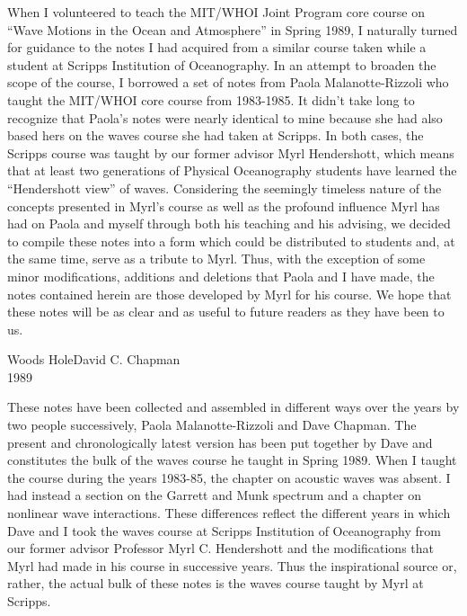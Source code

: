 When I volunteered to teach the MIT/WHOI Joint Program core course on
``Wave Motions in the Ocean and Atmosphere'' in Spring 1989, I naturally turned for
guidance to the notes I had acquired from a similar course taken while a student at
Scripps Institution of Oceanography. In an attempt to broaden the scope of the course,
I borrowed a set of notes from Paola Malanotte-Rizzoli who taught the MIT/WHOI
core course from 1983-1985. It didn't take long to recognize that Paola's notes were
nearly identical to mine because she had also based hers on the waves course she had
taken at Scripps. In both cases, the Scripps course was taught by our former advisor
Myrl Hendershott, which means that at least two generations of Physical
Oceanography students have learned the ``Hendershott view'' of waves. Considering
the seemingly timeless nature of the concepts presented in Myrl's course as well as the
profound influence Myrl has had on Paola and myself through both his teaching and
his advising, we decided to compile these notes into a form which could be distributed
to students and, at the same time, serve as a tribute to Myrl. Thus, with the exception
of some minor modifications, additions and deletions that Paola and I have made, the
notes contained herein are those developed by Myrl for his course. We hope that these
notes will be as clear and as useful to future readers as they have been to us.

\vspace{0.7em}
\noindent Woods Hole\hfill David C. Chapman\\
1989
\clearpage

\sourceblankpage

\thispagestyle{empty}
\vspace*{0.42in}

These notes have been collected and assembled in different ways over the years
by two people successively, Paola Malanotte-Rizzoli and Dave Chapman. The present
and chronologically latest version has been put together by Dave and constitutes the
bulk of the waves course he taught in Spring 1989. When I taught the course during
the years 1983-85, the chapter on acoustic waves was absent. I had instead a section on
the Garrett and Munk spectrum and a chapter on nonlinear wave interactions. These
differences reflect the different years in which Dave and I took the waves course at
Scripps Institution of Oceanography from our former advisor Professor Myrl C.
Hendershott and the modifications that Myrl had made in his course in successive
years. Thus the inspirational source or, rather, the actual bulk of these notes is the
waves course taught by Myrl at Scripps.

